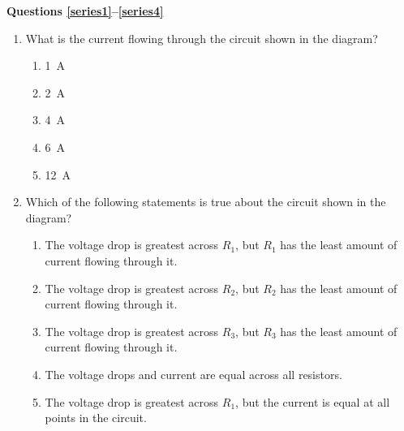 \documentclass{../../../oss-apphys}
\begin{document}
\genheader


\genmultidirections

\gengravity

\raggedcolumns
\begin{multicols*}{2}

  \textbf{Questions \ref{series1}--\ref{series4}}  
  \begin{center}
  \end{center}
  \begin{enumerate}[leftmargin=18pt]
    
  \item What is the current flowing through the circuit shown in the diagram?
    \begin{enumerate}[noitemsep,topsep=0pt,leftmargin=18pt,label=(\Alph*)]
    \item\SI{1}{\ampere}
    \item\SI{2}{\ampere}
    \item\SI{4}{\ampere}
    \item\SI{6}{\ampere}
    \item\SI{12}{\ampere}
    \end{enumerate}
    \label{series1}
  \item Which of the following statements is true about the circuit shown in the
    diagram?
    \begin{enumerate}[noitemsep,topsep=0pt,leftmargin=18pt,label=(\Alph*)]  
    \item The voltage drop is greatest across $R_1$, but $R_1$ has the least
      amount of current flowing through it.
    \item The voltage drop is greatest across $R_2$, but $R_2$ has the least
      amount of current flowing through it.
    \item The voltage drop is greatest across $R_3$, but $R_3$ has the least
      amount of current flowing through it.
    \item The voltage drops and current are equal across all resistors.
    \item The voltage drop is greatest across $R_1$, but the current is equal at
      all points in the circuit.
    \end{enumerate}
    \columnbreak
    

\end{enumerate}
\end{multicols*}
\end{document}
